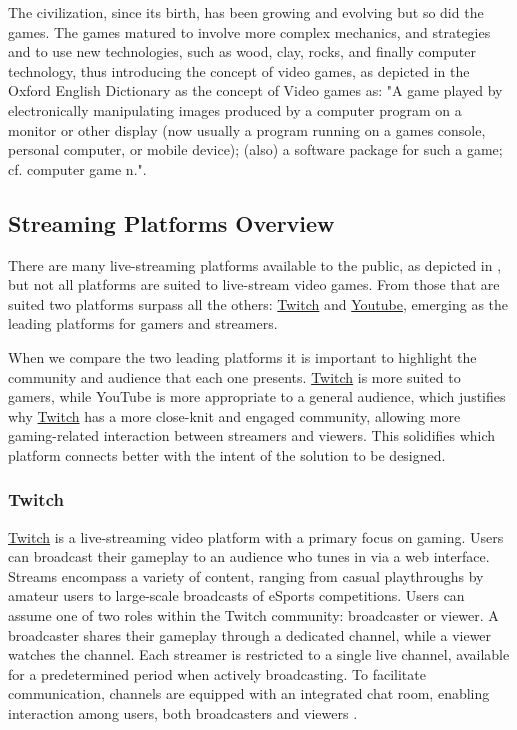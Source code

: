     The civilization, since its birth, has been growing and evolving but so did the games. The games matured to involve more complex mechanics, and strategies and to use new technologies, such as wood, clay, rocks, and finally computer technology, thus introducing the concept of video games, as depicted in the Oxford English Dictionary as the concept of Video games as: "A game played by electronically manipulating images produced by a computer program on a monitor or other display (now usually a program running on a games console, personal computer, or mobile device); (also) a software package for such a game; cf. computer game n."\cite{videogame_oed}.
    
\subsection{Streaming Platforms Overview}

    There are many live-streaming platforms available to the public, as depicted in \cite{EsportsLiveStreamingPlatforms}, but not all platforms are suited to live-stream video games. From those that are suited two platforms surpass all the others: \href{https://www.twitch.tv/}{Twitch} and \href{https://www.youtube.com/}{Youtube}, emerging as the leading platforms for gamers and streamers.

    When we compare the two leading platforms \cite{TwitchVSYoutube} it is important to highlight the community and audience that each one presents. \href{https://www.twitch.tv/}{Twitch} is more suited to gamers, while YouTube is more appropriate to a general audience, which justifies why \href{https://www.twitch.tv/}{Twitch} has a more close-knit and engaged community, allowing more gaming-related interaction between streamers and viewers. This solidifies which platform connects better with the intent of the solution to be designed.

\subsubsection{Twitch}
    \href{https://www.twitch.tv/}{Twitch} is a live-streaming video platform with a primary focus on gaming. Users can broadcast their gameplay to an audience who tunes in via a web interface. Streams encompass a variety of content, ranging from casual playthroughs by amateur users to large-scale broadcasts of eSports competitions. Users can assume one of two roles within the Twitch community: broadcaster or viewer. A broadcaster shares their gameplay through a dedicated channel, while a viewer watches the channel. Each streamer is restricted to a single live channel, available for a predetermined period when actively broadcasting. To facilitate communication, channels are equipped with an integrated chat room, enabling interaction among users, both broadcasters and viewers \cite{Twitch_streaming_platform}.

